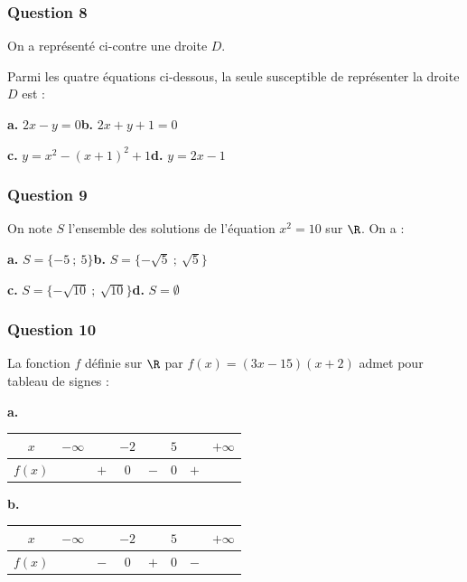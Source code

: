 \begin{minipage}[t]{0.8\textwidth}
\subsubsection*{Question 8}
On a représenté ci-contre une droite $D$.

Parmi les quatre équations ci-dessous, la seule susceptible de représenter la droite $D$ est :

\textbf{a.} $2x - y = 0$\hfill \textbf{b.} $2x + y + 1 = 0$

\textbf{c.} $y = x^2 - (x + 1)^2 + 1$\hfill \textbf{d.} $y = 2x - 1$
\end{minipage}
\hfill
\begin{minipage}[t]{0.15\textwidth}
\vspace{0pt}
\end{minipage}

\subsubsection*{Question 9}
On note $S$ l'ensemble des solutions de l'équation $x^2 = 10$ sur $\R$. On a :

\textbf{a.} $S = \{-5~;~5\}$\hfill \textbf{b.} $S = \{-\sqrt{5}~;~\sqrt{5}\}$

\textbf{c.} $S = \{-\sqrt{10}~;~\sqrt{10}\}$\hfill \textbf{d.} $S = \emptyset$

\subsubsection*{Question 10}
La fonction $f$ définie sur $\R$ par $f(x) = (3x - 15)(x + 2)$ admet pour tableau de signes :

\textbf{a.} 
\begin{tabular}{|c|ccccccc|}
\hline
$x$ & $-\infty$ & & $-2$ & & $5$ & & $+\infty$ \\
\hline
$f(x)$ & & $+$ & $0$ & $-$ & $0$ & $+$ &\\
\hline
\end{tabular}
\hfill 
\textbf{b.} 
\begin{tabular}{|c|ccccccc|}
\hline
$x$ & $-\infty$ & & $-2$ & & $5$ & & $+\infty$ \\
\hline
$f(x)$ & & $-$ & $0$ & $+$ & $0$ & $-$ &\\
\hline
\end{tabular}

